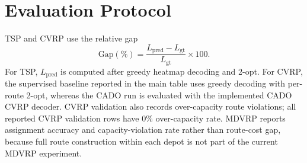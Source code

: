 \begin{table}[htbp]
\centering
\caption{CADO fine-tuning configurations used for the reported experiments.}
\label{tab:app-cado-configs}
\end{table}

\begin{table}[htbp]
\centering
\caption{Reported CADO validation outcomes.}
\label{tab:app-cado-results}
\end{table}

\section{Evaluation Protocol}
\label{app:evaluation-protocol}

TSP and CVRP use the relative gap
\[
    \mathrm{Gap}(\%)
    =
    \frac{L_{\mathrm{pred}} - L_{\mathrm{gt}}}{L_{\mathrm{gt}}}
    \times 100.
\]
For TSP, \(L_{\mathrm{pred}}\) is computed after greedy heatmap decoding and 2-opt. For CVRP,
the supervised baseline reported in the main table uses greedy decoding with per-route 2-opt,
whereas the CADO run is evaluated with the implemented CADO CVRP decoder. CVRP validation also
records over-capacity route violations; all reported CVRP validation rows have 0\%
over-capacity rate. MDVRP reports assignment accuracy and capacity-violation rate rather than
route-cost gap, because full route construction within each depot is not part of the current
MDVRP experiment.

